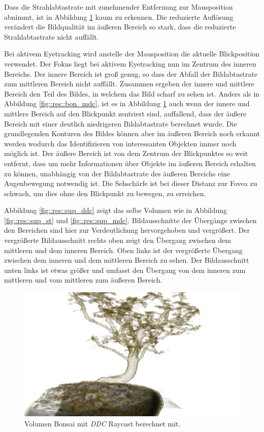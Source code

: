 Dass die Strahlabtastrate mit zunehmender Entfernung zur Mausposition abnimmt, ist in Abbildung \ref{fig::res::bon_ddc} kaum zu erkennen.
Die reduzierte Auflösung verändert die Bildqualität im äußeren Bereich so stark, dass die reduzierte Strahlabtastrate nicht auffällt.

Bei aktivem Eyetracking wird anstelle der Mausposition die aktuelle Blickposition verwendet.
Der Fokus liegt bei aktivem Eyetracking nun im Zentrum des inneren Bereichs.
Der innere Bereich ist groß genug, so dass der Abfall der Bildabtastrate zum mittleren Bereich nicht auffällt.
Zusammen ergeben der innere und mittlere Bereich den Teil des Bildes, in welchem das Bild scharf zu sehen ist.
Anders als in Abbildung \ref{fig::res::bon_mdc}, ist es in Abbildung \ref{fig::res::bon_ddc} auch wenn der innere und mittlere Bereich auf den Blickpunkt zentriert sind, auffallend, dass der äußere Bereich mit einer deutlich niedrigeren Bildabtastrate berechnet wurde.
Die grundlegenden Konturen des Bildes können aber im äußeren Bereich noch erkannt werden wodurch das Identifizieren von interessanten Objekten immer noch möglich ist.
Der äußere Bereich ist von dem Zentrum der Blickpunktes so weit entfernt, dass um mehr Informationen über Objekte im äußeren Bereich erhalten zu können, unabhängig von der Bildabtastrate des äußeren Bereichs eine Augenbewegung notwendig ist.
Die Sehschärfe ist bei dieser Distanz zur Fovea zu schwach, um dies ohne den Blickpunkt zu bewegen, zu erreichen.

Abbildung \ref{fig::res::sup_ddc} zeigt das selbe Volumen wie in Abbildung \ref{fig::res::sup_st} und \ref{fig::res::sup_mdc}.
Bildausschnitte der Übergänge zwischen den Bereichen sind hier zur Verdeutlichung hervorgehoben und vergrößert.
Der vergrößerte Bildausschnitt rechts oben zeigt den Übergang zwischen dem mittleren und dem inneren Bereich.
Oben links ist der vergrößerte Übergang zwischen dem inneren und dem mittleren Bereich zu sehen.
Der Bildausschnitt unten links ist etwas größer und umfasst den Übergang von dem inneren zum mittleren und vom mittleren zum äußeren Bereich.

\begin{landscape}
	\begin{figure}
		\centering
		\includegraphics[width=1\textheight]{../../Grafiken/results/picture_quality/bonsai/DDC_img-1_ray-1-5.png}
		\caption{Volumen Bonsai mit \emph{DDC} Raycast berechnet mit.}
		\label{fig::res::bon_ddc}
	\end{figure}
\end{landscape}

